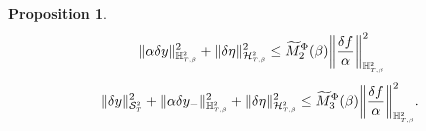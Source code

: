 \documentclass[10pt]{article} %
\newtheorem{proposition}[theorem]{Proposition}
\newcommand\cH{\mathcal H}
\newcommand\cS{\mathcal S}
\newcommand{\smalltext}[1]{\text{\fontsize{4}{4}\selectfont$#1$}}
\def \H{\mathbb{H}}
\begin{document}
\begin{proposition}
\begin{equation*}
		\;
		\|\alpha\delta y\|^2_{\H^\smalltext{2}_{\smalltext{T}\smalltext{,}\smalltext{\beta}}} + \|\delta\eta\|^2_{\cH^\smalltext{2}_{\smalltext{T}\smalltext{,}\smalltext{\beta}}} 
		\leq \widetilde M^\Phi_2(\beta) \bigg\|\frac{\delta f}{\alpha}\bigg\|^2_{\H^\smalltext{2}_{\smalltext{T}\smalltext{,}\smalltext{\beta}}}
	\end{equation*}
	\begin{equation*}
		\|\delta y\|^2_{\cS^\smalltext{2}_\smalltext{T}} + \|\alpha\delta y_{-}\|^2_{\H^\smalltext{2}_{\smalltext{T}\smalltext{,}\smalltext{\beta}}} + \|\delta\eta\|^2_{\cH^\smalltext{2}_{\smalltext{T}\smalltext{,}\smalltext{\beta}}} 
		\leq \widetilde M^\Phi_3(\beta) \bigg\|\frac{\delta f}{\alpha}\bigg\|^2_{\H^\smalltext{2}_{\smalltext{T}\smalltext{,}\smalltext{\beta}}}.
	\end{equation*}
\end{proposition}
\end{document}
